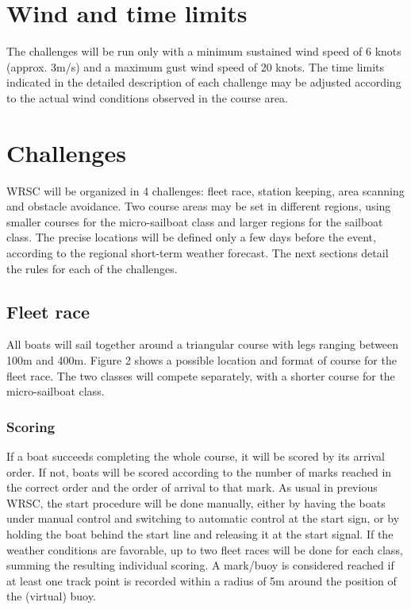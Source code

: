 \documentclass[12pt]{article}
\begin{document}
\section{Wind and time limits}
The challenges will be run only with a minimum sustained wind speed of 6 knots
(approx. 3m/s)
and a maximum gust wind speed of 20 knots. The time limits indicated in the
detailed
description of each challenge may be adjusted according to the actual wind
conditions observed
in the course area.

\section{Challenges}
WRSC will be organized in 4 challenges: fleet race, station keeping, area
scanning and obstacle avoidance.
Two course areas may be set in different regions, using smaller courses for the
micro-sailboat
class and larger regions for the sailboat class. The precise locations will be
defined only a few
days before the event, according to the regional short-term weather forecast.
The next sections
detail the rules for each of the challenges.

\subsection{Fleet race}

All boats will sail together around a triangular course with legs ranging
between 100m and
400m. Figure 2 shows a possible location and format of course for the fleet
race. The two
classes will compete separately, with a shorter course for the micro-sailboat
class.
\subsubsection{Scoring}

If a boat succeeds completing the whole course, it will be scored by its arrival
order. If not,
boats will be scored according to the number of marks reached in the correct
order and the
order of arrival to that mark. As usual in previous WRSC, the start procedure
will be done
manually, either by having the boats under manual control and switching to
automatic control
at the start sign, or by holding the boat behind the start line and releasing it
at the start signal.
If the weather conditions are favorable, up to two fleet races will be done for
each class,
summing the resulting individual scoring. A mark/buoy is considered reached if
at least one
track point is recorded within a radius of 5m around the position of the
(virtual) buoy.
\end{document}
